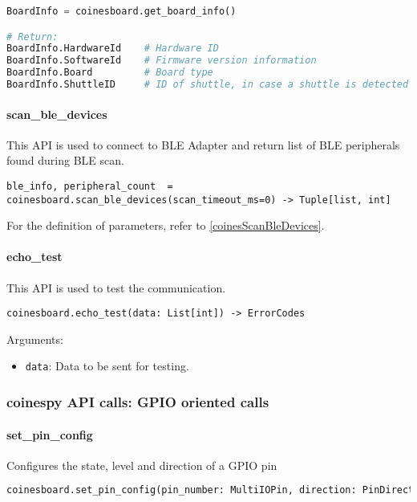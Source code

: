 \begin{lstlisting}[language=python]
BoardInfo = coinesboard.get_board_info()

# Return:
BoardInfo.HardwareId    # Hardware ID
BoardInfo.SoftwareId    # Firmware version information
BoardInfo.Board         # Board type
BoardInfo.ShuttleID     # ID of shuttle, in case a shuttle is detected
\end{lstlisting}

\paragraph{scan\_ble\_devices}
This API is used to connect to BLE Adapter and return list of BLE peripherals found during BLE scan.

\begin{lstlisting}
ble_info, peripheral_count  = coinesboard.scan_ble_devices(scan_timeout_ms=0) -> Tuple[list, int]
\end{lstlisting}

For the definition of parameters, refer to \ref{coinesScanBleDevices}.

\paragraph{echo\_test}
This API is used to test the communication.

\begin{lstlisting}
coinesboard.echo_test(data: List[int]) -> ErrorCodes
\end{lstlisting}

Arguments:
\begin{itemize}
	\item \texttt{data}: Data to be sent for testing.
\end{itemize}

\subsubsection{coinespy API calls: GPIO oriented calls}

\paragraph{set\_pin\_config}
Configures the state, level and direction of a GPIO pin

\begin{lstlisting}[language=python]
coinesboard.set_pin_config(pin_number: MultiIOPin, direction: PinDirection, output_state: PinValue) -> ErrorCodes
\end{lstlisting}

